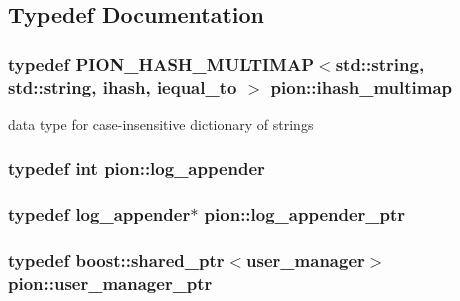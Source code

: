 \subsection{Typedef Documentation}
\hypertarget{namespacepion_a2cd31d7bbe0e98008bd4e6f135103c0e}{
\subsubsection[{ihash\-\_\-multimap}]{\setlength{\rightskip}{0pt plus 5cm}typedef {\bf P\-I\-O\-N\-\_\-\-H\-A\-S\-H\-\_\-\-M\-U\-L\-T\-I\-M\-A\-P}$<$std\-::string, std\-::string, {\bf ihash}, {\bf iequal\-\_\-to} $>$ {\bf pion\-::ihash\-\_\-multimap}}}\label{namespacepion_a2cd31d7bbe0e98008bd4e6f135103c0e}


data type for case-\/insensitive dictionary of strings 

\hypertarget{namespacepion_a0ae721a15721415f669eea72b5410bfb}{
\subsubsection[{log\-\_\-appender}]{\setlength{\rightskip}{0pt plus 5cm}typedef int {\bf pion\-::log\-\_\-appender}}}\label{namespacepion_a0ae721a15721415f669eea72b5410bfb}
\hypertarget{namespacepion_a66164fd1ba2d2866081712f2c82300d5}{
\subsubsection[{log\-\_\-appender\-\_\-ptr}]{\setlength{\rightskip}{0pt plus 5cm}typedef {\bf log\-\_\-appender}$\ast$ {\bf pion\-::log\-\_\-appender\-\_\-ptr}}}\label{namespacepion_a66164fd1ba2d2866081712f2c82300d5}
\hypertarget{namespacepion_a20602680730b88b8efd08b3730d601af}{
\subsubsection[{user\-\_\-manager\-\_\-ptr}]{\setlength{\rightskip}{0pt plus 5cm}typedef boost\-::shared\-\_\-ptr$<${\bf user\-\_\-manager}$>$ {\bf pion\-::user\-\_\-manager\-\_\-ptr}}}\label{namespacepion_a20602680730b88b8efd08b3730d601af}



